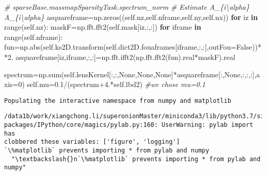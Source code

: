 \documentclass[11pt]{article}
\newenvironment{Shaded}{}{}
\newcommand{\KeywordTok}[1]{\textcolor[rgb]{0.00,0.44,0.13}{\textbf{{#1}}}}
\newcommand{\DecValTok}[1]{\textcolor[rgb]{0.25,0.63,0.44}{{#1}}}
\newcommand{\FloatTok}[1]{\textcolor[rgb]{0.25,0.63,0.44}{{#1}}}
\newcommand{\CommentTok}[1]{\textcolor[rgb]{0.38,0.63,0.69}{\textit{{#1}}}}
\newcommand{\NormalTok}[1]{{#1}}
\newcommand{\VariableTok}[1]{\textcolor[rgb]{0.10,0.09,0.49}{{#1}}}
\newcommand{\ControlFlowTok}[1]{\textcolor[rgb]{0.00,0.44,0.13}{\textbf{{#1}}}}
\newcommand{\OperatorTok}[1]{\textcolor[rgb]{0.40,0.40,0.40}{{#1}}}
\newcommand{\BuiltInTok}[1]{{#1}}
\begin{document}
\begin{Shaded}
\begin{Highlighting}[]
\CommentTok{# sparseBase.massmapSparsityTask.spectrum_norm}
\CommentTok{# Estimate A_\{i\textbackslash{}alpha\} A_\{i\textbackslash{}alpha\}}
\NormalTok{asquareframe}\OperatorTok{=}\NormalTok{np.zeros((}\VariableTok{self}\NormalTok{.nz,}\VariableTok{self}\NormalTok{.nframe,}\VariableTok{self}\NormalTok{.ny,}\VariableTok{self}\NormalTok{.nx))}
\ControlFlowTok{for}\NormalTok{ iz }\KeywordTok{in} \BuiltInTok{range}\NormalTok{(}\VariableTok{self}\NormalTok{.nz):}
\NormalTok{    maskF}\OperatorTok{=}\NormalTok{np.fft.fft2(}\VariableTok{self}\NormalTok{.mask[iz,:,:])}
    \ControlFlowTok{for}\NormalTok{ iframe }\KeywordTok{in} \BuiltInTok{range}\NormalTok{(}\VariableTok{self}\NormalTok{.nframe):}
\NormalTok{        fun}\OperatorTok{=}\NormalTok{np.}\BuiltInTok{abs}\NormalTok{(}\VariableTok{self}\NormalTok{.ks2D.transform(}\VariableTok{self}\NormalTok{.dict2D.fouaframes[iframe,:,:],outFou}\OperatorTok{=}\VariableTok{False}\NormalTok{))}\OperatorTok{**}\FloatTok{2.}
\NormalTok{        asquareframe[iz,iframe,:,:]}\OperatorTok{=}\NormalTok{np.fft.ifft2(np.fft.fft2(fun).real}\OperatorTok{*}\NormalTok{maskF).real}

\NormalTok{spectrum}\OperatorTok{=}\NormalTok{np.}\BuiltInTok{sum}\NormalTok{(}\VariableTok{self}\NormalTok{.lensKernel[:,:,}\VariableTok{None}\NormalTok{,}\VariableTok{None}\NormalTok{,}\VariableTok{None}\NormalTok{]}\OperatorTok{*}\NormalTok{asquareframe[:,}\VariableTok{None}\NormalTok{,:,:,:],axis}\OperatorTok{=}\DecValTok{0}\NormalTok{)}
\VariableTok{self}\NormalTok{.mu}\OperatorTok{=}\FloatTok{0.1}\OperatorTok{/}\NormalTok{(spectrum}\FloatTok{+4.}\OperatorTok{*}\VariableTok{self}\NormalTok{.lbd2) }\CommentTok{#we chose mu=0.1}
\end{Highlighting}
\end{Shaded}

    \begin{Verbatim}[commandchars=\\\{\}]
Populating the interactive namespace from numpy and matplotlib
\end{Verbatim}

    \begin{Verbatim}[commandchars=\\\{\}]
/data1b/work/xiangchong.li/superonionMaster/miniconda3/lib/python3.7/site-
packages/IPython/core/magics/pylab.py:160: UserWarning: pylab import has
clobbered these variables: ['figure', 'logging']
`\%matplotlib` prevents importing * from pylab and numpy
  "\textbackslash{}n`\%matplotlib` prevents importing * from pylab and numpy"
\end{Verbatim}
\end{document}
